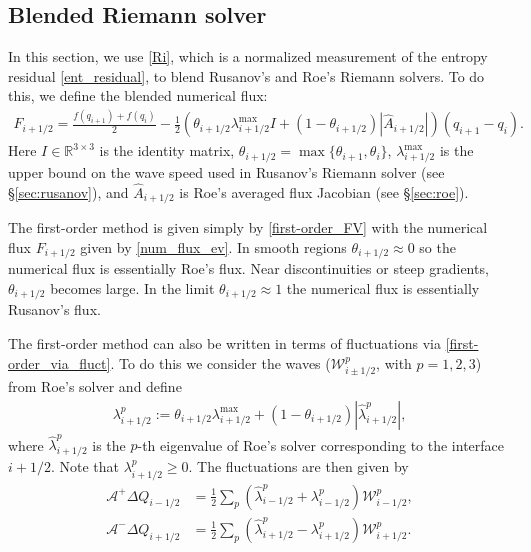 \documentclass[preprint, 11pt]{article}
\newcommand{\W}{{\mathcal W}}
\newcommand{\A}{{\mathcal A}}
\newcommand{\apdq}{\A^+ \!\!{\Delta} Q}
\newcommand{\amdq}{\A^- \!\!{\Delta} Q}
\newcommand{\imh}{{i-1/2}}
\newcommand{\iph}{{i+1/2}}
\newcommand{\bff}{{f}}
\newcommand{\bfq}{{q}}
\begin{document}
\subsection{Blended Riemann solver}\label{sec:blended_rs}
In this section, we use \eqref{Ri}, which is a normalized measurement of the entropy residual \eqref{ent_residual},
to blend Rusanov's and Roe's Riemann solvers. To do this, we define the blended numerical flux:
\begin{align}\label{num_flux_ev}
  F_{i+1/2} = \frac{\bff(\bfq_{i+1})+\bff(\bfq_i)}{2}
  - \frac{1}{2} \left( \theta_{i+1/2}\lambda_{i+1/2}^{\max} I + (1-\theta_{i+1/2})|\hat A_{i+1/2}| \right)(\bfq_{i+1}-\bfq_{i}).
\end{align}
Here $I\in\mathbb{R}^{3\times 3}$ is the identity matrix,
$\theta_{i+1/2}=\max\{\theta_{i+1},\theta_i\}$, $\lambda_{i+1/2}^{\max}$ is the
upper bound on the wave speed used in Rusanov's Riemann solver (see \S \ref{sec:rusanov}),
and $\hat A_{i+1/2}$ is Roe's averaged flux Jacobian (see \S \ref{sec:roe}).

The first-order method is given simply by \eqref{first-order_FV}
with the numerical flux $F_{i+1/2}$ given by \eqref{num_flux_ev}.
In smooth regions $\theta_{i+1/2}\approx 0$ so the numerical flux is essentially Roe's flux.
Near discontinuities or steep gradients, $\theta_{i+1/2}$ becomes large. In the limit $\theta_{i+1/2}\approx 1$
the numerical flux is essentially Rusanov's flux.

The first-order method can also be written in terms of fluctuations via \eqref{first-order_via_fluct}.
To do this we consider the waves ($\W^p_{i\pm 1/2}$, with $p=1,2,3$)
from Roe's solver and define
\begin{align}\label{lambda_p}
  \lambda_{i+1/2}^p := \theta_{i+1/2}\lambda_{i+1/2}^{\max} + (1-\theta_{i+1/2})|\hat \lambda_{i+1/2}^p|,
\end{align}
where $\hat\lambda_{i+1/2}^p$ is the $p$-th eigenvalue of Roe's solver corresponding to the
interface $i+1/2$. Note that $\lambda_{i+1/2}^p\geq 0$.
The fluctuations are then given by
\begin{subequations}\label{ev_fluctuations}
\begin{align}
  \apdq_\imh & = \frac{1}{2}\sum_p \left(\hat\lambda_{i-1/2}^p + \lambda_{i-1/2}^p\right)\W_{i-1/2}^p, \\
  \amdq_\iph & = \frac{1}{2}\sum_p \left(\hat\lambda_{i+1/2}^p - \lambda_{i+1/2}^p\right)\W_{i+1/2}^p.
\end{align}
\end{subequations}
\end{document}
